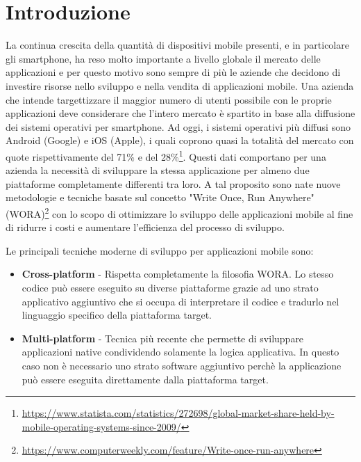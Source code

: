 
\section{Introduzione}
La continua crescita della quantità di dispositivi mobile presenti, e in particolare gli smartphone, ha reso molto importante a livello globale il mercato delle applicazioni e per questo motivo sono sempre di più le aziende che decidono di investire risorse nello sviluppo e nella vendita di applicazioni mobile. Una azienda che intende targettizzare il maggior numero di utenti possibile con le proprie applicazioni deve considerare che l'intero mercato è spartito in base alla diffusione dei sistemi operativi per smartphone. Ad oggi, i sistemi operativi più diffusi sono Android (Google) e iOS (Apple), i quali coprono quasi la totalità del mercato con quote rispettivamente del 71\% e del 28\%\footnote{\href{https://www.statista.com/statistics/272698/global-market-share-held-by-mobile-operating-systems-since-2009/}{https://www.statista.com/statistics/272698/global-market-share-held-by-mobile-operating-systems-since-2009/}}. Questi dati comportano per una azienda la necessità di sviluppare la stessa applicazione per almeno due piattaforme completamente differenti tra loro. A tal proposito sono nate nuove metodologie e tecniche basate sul concetto "Write Once, Run Anywhere" (WORA)\footnote{\href{https://www.computerweekly.com/feature/Write-once-run-anywhere}{https://www.computerweekly.com/feature/Write-once-run-anywhere}} con lo scopo di ottimizzare lo sviluppo delle applicazioni mobile al fine di ridurre i costi e aumentare l'efficienza del processo di sviluppo.

Le principali tecniche moderne di sviluppo per applicazioni mobile sono:
\begin{itemize}
    \item \textbf{Cross-platform} - Rispetta completamente la filosofia WORA. Lo stesso codice può essere eseguito su diverse piattaforme grazie ad uno strato applicativo aggiuntivo che si occupa di interpretare il codice e tradurlo nel linguaggio specifico della piattaforma target.
    \item \textbf{Multi-platform} - Tecnica più recente che permette di sviluppare applicazioni native condividendo solamente la logica applicativa. In questo caso non è necessario uno strato software aggiuntivo perchè la applicazione può essere eseguita direttamente dalla piattaforma target.
\end{itemize}

